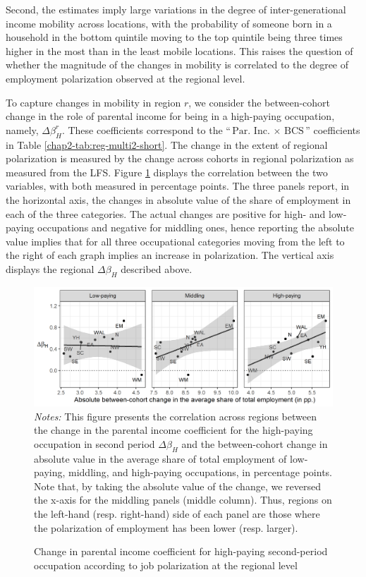 Second, the estimates imply large variations in the degree of inter-generational income mobility across locations, with the probability of someone born in a household in the bottom quintile moving to the top quintile being three times higher in the most than in the least mobile locations. This raises the question of whether the magnitude of the changes in mobility is correlated to the degree of employment polarization observed at the regional level. 

To capture changes in mobility in region $r$, we consider the between-cohort change in the role of parental income for being in a high-paying occupation, namely, $\Delta\beta_H^r$. These coefficients correspond to the ``$\text{Par. Inc. }\times\text{ BCS}$'' coefficients in Table \ref{chap2-tab:reg-multi2-short}. The change in the extent of regional polarization is measured by the change across cohorts in regional polarization as measured from the LFS. Figure \ref{chap2-fig:regocc-absolute-high} displays the correlation between the two variables, with both measured in percentage points. The three panels report, in the horizontal axis, the changes in absolute value of the share of employment in each of the three categories. The actual changes are positive for high- and low-paying occupations and negative for middling ones, hence reporting the absolute value implies that for all three occupational categories moving from the left to the right of each graph implies an increase in polarization. The vertical axis displays the regional $\Delta\beta_{H}$ described above.
\begin{figure}[!tb]
    \centering
    \caption{Change in parental income coefficient for high-paying second-period occupation according to job polarization at the regional level}
    \label{chap2-fig:regocc-absolute-high}
    \includegraphics[width=\linewidth]{chap2/graphic/regocc-absolute-high.png}
    \vspace{-3em}
	\justify\singlespacing\footnotesize{\textit{Notes:} This figure presents the correlation across regions between the change in the parental income coefficient for the high-paying occupation in second period $\Delta\beta_H$ and the between-cohort change in absolute value in the average share of total employment of low-paying, middling, and high-paying occupations, in percentage points. Note that, by taking the absolute value of the change, we reversed the x-axis for the middling panels (middle column). Thus, regions on the left-hand (resp. right-hand) side of each panel are those where the polarization of employment has been lower (resp. larger).}
\end{figure}


